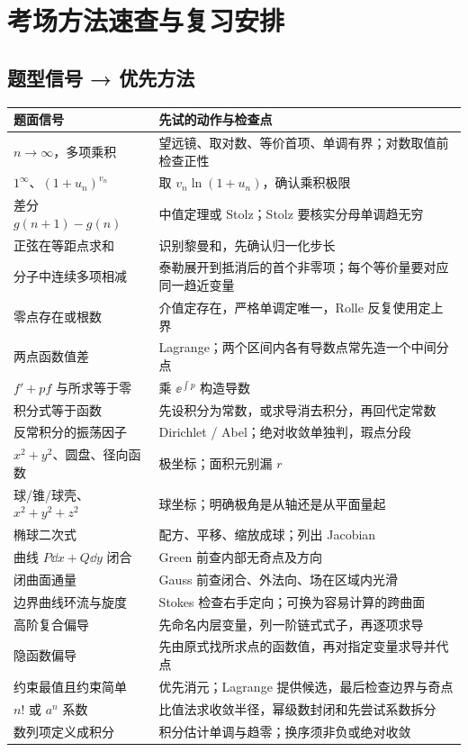 \chapter{考场方法速查与复习安排}
\section{题型信号 → 优先方法}
\begin{longtable}{p{}p{}}
\toprule 题面信号 & 先试的动作与检查点\\\midrule\endhead
$n\to\infty$，多项乘积 & 望远镜、取对数、等价首项、单调有界；对数取值前检查正性\\
$1^\infty$、$(1+u_n)^{v_n}$ & 取 $v_n\ln(1+u_n)$，确认乘积极限\\
差分 $g(n+1)-g(n)$ & 中值定理或 Stolz；Stolz 要核实分母单调趋无穷\\
正弦在等距点求和 & 识别黎曼和，先确认归一化步长\\
分子中连续多项相减 & 泰勒展开到抵消后的首个非零项；每个等价量要对应同一趋近变量\\
零点存在或根数 & 介值定存在，严格单调定唯一，Rolle 反复使用定上界\\
两点函数值差 & Lagrange；两个区间内各有导数点常先造一个中间分点\\
$f'+pf$ 与所求等于零 & 乘 $\ee^{\int p}$ 构造导数\\
积分式等于函数 & 先设积分为常数，或求导消去积分，再回代定常数\\
反常积分的振荡因子 & Dirichlet / Abel；绝对收敛单独判，瑕点分段\\
$x^2+y^2$、圆盘、径向函数 & 极坐标；面积元别漏 $r$\\
球/锥/球壳、$x^2+y^2+z^2$ & 球坐标；明确极角是从轴还是从平面量起\\
椭球二次式 & 配方、平移、缩放成球；列出 Jacobian\\
曲线 $P\dd x+Q\dd y$ 闭合 & Green 前查内部无奇点及方向\\
闭曲面通量 & Gauss 前查闭合、外法向、场在区域内光滑\\
边界曲线环流与旋度 & Stokes 检查右手定向；可换为容易计算的跨曲面\\
高阶复合偏导 & 先命名内层变量，列一阶链式式子，再逐项求导\\
隐函数偏导 & 先由原式找所求点的函数值，再对指定变量求导并代点\\
约束最值且约束简单 & 优先消元；Lagrange 提供候选，最后检查边界与奇点\\
$n!$ 或 $a^n$ 系数 & 比值法求收敛半径，幂级数封闭和先尝试系数拆分\\
数列项定义成积分 & 积分估计单调与趋零；换序须非负或绝对收敛\\
\bottomrule
\end{longtable}

